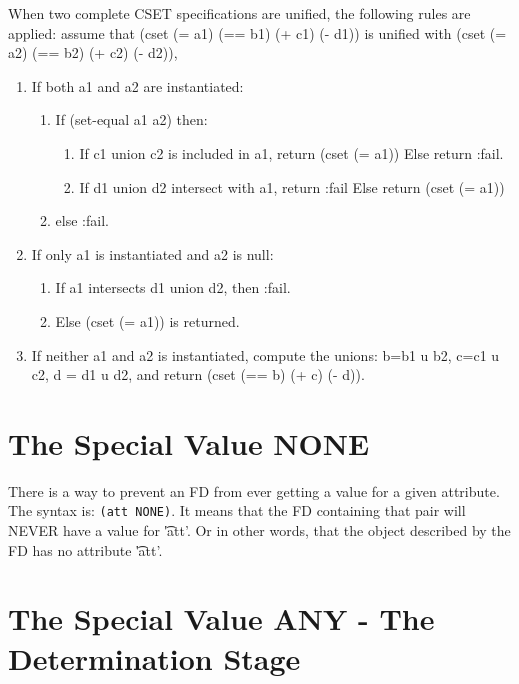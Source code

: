 \documentclass[10pt,a4paper]{report}
\begin{document}
When two complete CSET specifications are unified, the following rules are
applied:  assume that (cset (= a1) (== b1) (+ c1) (- d1)) is unified with 
(cset (= a2) (== b2) (+ c2) (- d2)),
\begin{enumerate}
\item If both a1 and a2 are instantiated:
\begin{enumerate}
\item If (set-equal a1 a2) then:
\begin{enumerate}
\item If c1 union c2 is included in a1, return (cset (= a1))
Else return :fail.

\item If d1 union d2 intersect with a1, return :fail
Else return (cset (= a1))
\end{enumerate}

\item else :fail.
\end{enumerate}

\item If only a1 is instantiated and a2 is null:
\begin{enumerate}
\item If a1 intersects d1 union d2, then :fail.

\item Else (cset (= a1)) is returned.
\end{enumerate}

\item If neither a1 and a2 is instantiated, compute the unions: b=b1 u b2, c=c1 u
c2, d = d1 u d2, and return (cset (== b) (+ c) (- d)).
\end{enumerate}




\section{The Special Value NONE}

There is a way to prevent an FD from ever getting a value for a
given attribute. The syntax is: {\tt (att NONE)}.  It means that
the FD containing that pair will NEVER have a value for \t'att'.
Or in other words, that the object described by the FD has no
attribute \t'att'.


\section{The Special Value ANY - The Determination Stage}
\label{determination}
\end{document}
